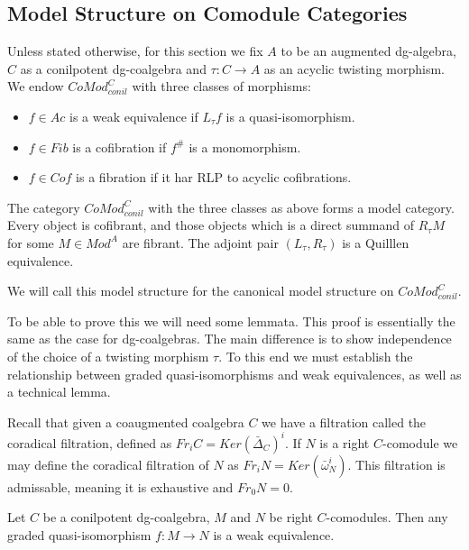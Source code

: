 \documentclass[../thesis.tex]{subfiles}
\begin{document}
        \subsection{Model Structure on Comodule Categories}

            Unless stated otherwise, for this section we fix $A$ to be an augmented dg-algebra, $C$ as a conilpotent dg-coalgebra and $\tau : C \rightarrow A$ as an acyclic twisting morphism. We endow $CoMod^C_{conil}$ with three classes of morphisms:
            \begin{itemize}
                \item $f\in Ac$ is a weak equivalence if $L_\tau f$ is a quasi-isomorphism.
                \item $f\in Fib$ is a cofibration if $f^\#$ is a monomorphism.
                \item $f\in Cof$ is a fibration if it har RLP to acyclic cofibrations.
            \end{itemize}

            \begin{thm}\label{thm: model-comod}
              The category $CoMod^C_{conil}$ with the three classes as above forms a model category. Every object is cofibrant, and those objects which is a direct summand of $R_\tau M$ for some $M\in Mod^A$ are fibrant. The adjoint pair $(L_\tau, R_\tau)$ is a Quilllen equivalence.
            \end{thm}

            We will call this model structure for the canonical model structure on $CoMod^C_{conil}$.

            To be able to prove this we will need some lemmata. This proof is essentially the same as the case for dg-coalgebras. The main difference is to show independence of the choice of a twisting morphism $\tau$. To this end we must establish the relationship between graded quasi-isomorphisms and weak equivalences, as well as a technical lemma.

            Recall that given a coaugmented coalgebra $C$ we have a filtration called the coradical filtration, defined as $Fr_iC = Ker(\bar{\Delta}_C)^i$. If $N$ is a right $C$-comodule we may define the coradical filtration of $N$ as $Fr_iN = Ker(\bar{\omega}_N^i)$. This filtration is admissable, meaning it is exhaustive and $Fr_0N=0$.

            \begin{lemma}
                Let $C$ be a conilpotent dg-coalgebra, $M$ and $N$ be right $C$-comodules. Then any graded quasi-isomorphism $f: M \rightarrow N$ is a weak equivalence.
            \end{lemma}
\end{document}
